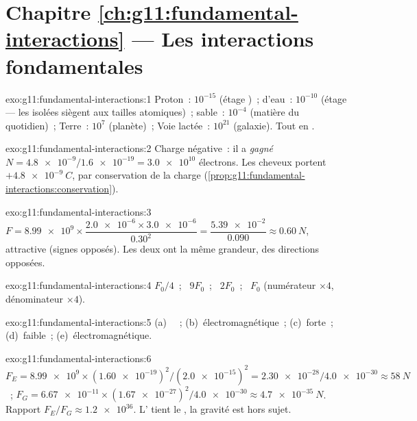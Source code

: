 \section*{Chapitre \ref{ch:g11:fundamental-interactions} --- Les interactions fondamentales}

\begin{solution}{exo:g11:fundamental-interactions:1}
Proton~: $10^{-15}$ (étage )~;
 d'eau~: $10^{-10}$ (étage
 --- les
 isolées siègent aux tailles
atomiques)~; sable~: $10^{-4}$ (matière du quotidien)~; Terre~: $10^{7}$
(planète)~; Voie lactée~: $10^{21}$ (galaxie). Tout en
.
\end{solution}

\begin{solution}{exo:g11:fundamental-interactions:2}
Charge négative~: il a \emph{gagné}
$N = \num{4.8e-9}/\num{1.6e-19} = \num{3.0e10}$ électrons. Les cheveux
portent $+\qty{4.8e-9}{C}$, par conservation de la charge
(\cref{prop:g11:fundamental-interactions:conservation}).
\end{solution}

\begin{solution}{exo:g11:fundamental-interactions:3}
$F = \num{8.99e9} \times \dfrac{\num{2.0e-6} \times \num{3.0e-6}}{0.30^2}
= \dfrac{\num{5.39e-2}}{0.090} \approx \qty{0.60}{N}$, attractive
(signes opposés). Les deux  ont la même
grandeur, des directions opposées.
\end{solution}

\begin{solution}{exo:g11:fundamental-interactions:4}
$F_0/4$~; \ $9F_0$~; \ $2F_0$~; \ $F_0$ (numérateur $\times 4$,
dénominateur $\times 4$).
\end{solution}

\begin{solution}{exo:g11:fundamental-interactions:5}
(a)~ ~; (b)~électromagnétique~;
(c)~forte~; (d)~faible~; (e)~électromagnétique.
\end{solution}

\begin{solution}{exo:g11:fundamental-interactions:6}
$F_E = \num{8.99e9} \times (\num{1.60e-19})^2/(\num{2.0e-15})^2
= \num{2.30e-28}/\num{4.0e-30} \approx \qty{58}{N}$~;
$F_G = \num{6.67e-11} \times (\num{1.67e-27})^2/\num{4.0e-30}
\approx \qty{4.7e-35}{N}$. Rapport $F_E/F_G \approx \num{1.2e36}$.
L' tient le
, la gravité est hors sujet.
\end{solution}

